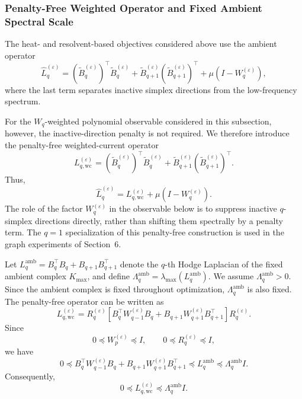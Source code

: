 \documentclass[pdflatex,sn-mathphys-num]{sn-jnl}%
\theoremstyle{thmstyleone}%
\theoremstyle{thmstyletwo}%
\theoremstyle{thmstylethree}%
\begin{document}
\subsubsection{Penalty-Free Weighted Operator and Fixed Ambient Spectral Scale}

The heat- and resolvent-based objectives considered above use the ambient operator
\[
\widehat L_q^{(\varepsilon)}
=
\left(\widetilde B_q^{(\varepsilon)}\right)^\top
\widetilde B_q^{(\varepsilon)}
+
\widetilde B_{q+1}^{(\varepsilon)}
\left(\widetilde B_{q+1}^{(\varepsilon)}\right)^\top
+
\mu\left(I-W_q^{(\varepsilon)}\right),
\]
where the last term separates inactive simplex directions from the low-frequency spectrum.

For the \(W_q\)-weighted polynomial observable considered in this subsection, however, the inactive-direction penalty is not required. We therefore introduce the penalty-free weighted-current operator
\[
L_{q,\mathrm{wc}}^{(\varepsilon)}
=
\left(\widetilde B_q^{(\varepsilon)}\right)^\top
\widetilde B_q^{(\varepsilon)}
+
\widetilde B_{q+1}^{(\varepsilon)}
\left(\widetilde B_{q+1}^{(\varepsilon)}\right)^\top.
\]
Thus,
\[
\widehat L_q^{(\varepsilon)}
=
L_{q,\mathrm{wc}}^{(\varepsilon)}
+
\mu\left(I-W_q^{(\varepsilon)}\right).
\]
The role of the factor \(W_q^{(\varepsilon)}\) in the observable below is to suppress inactive \(q\)-simplex directions directly, rather than shifting them spectrally by a penalty term. The \(q=1\) specialization of this penalty-free construction is used in the graph experiments of Section~6.

Let $L_q^{\mathrm{amb}}
=
B_q^\top B_q
+
B_{q+1}B_{q+1}^\top$
denote the \(q\)-th Hodge Laplacian of the fixed ambient complex \(K_{\max}\), and define
$\Lambda_q^{\mathrm{amb}}
=
\lambda_{\max}
\left(
L_q^{\mathrm{amb}}
\right)$.
We assume \(\Lambda_q^{\mathrm{amb}}>0\).
Since the ambient complex is fixed throughout optimization,
\(\Lambda_q^{\mathrm{amb}}\) is also fixed.
The penalty-free operator can be written as
\[
L_{q,\mathrm{wc}}^{(\varepsilon)}
=
R_q^{(\varepsilon)}
\left[
B_q^\top W_{q-1}^{(\varepsilon)} B_q
+
B_{q+1}W_{q+1}^{(\varepsilon)}B_{q+1}^\top
\right]
R_q^{(\varepsilon)}.
\]
Since
\[
0\preceq W_p^{(\varepsilon)}\preceq I,
\qquad
0\preceq R_q^{(\varepsilon)}\preceq I,
\]
we have
\[
0
\preceq
B_q^\top W_{q-1}^{(\varepsilon)}B_q
+
B_{q+1}W_{q+1}^{(\varepsilon)}B_{q+1}^\top
\preceq
L_q^{\mathrm{amb}}
\preceq
\Lambda_q^{\mathrm{amb}}I.
\]
Consequently,
\[
0
\preceq
L_{q,\mathrm{wc}}^{(\varepsilon)}
\preceq
\Lambda_q^{\mathrm{amb}}I.
\]
\end{document}

